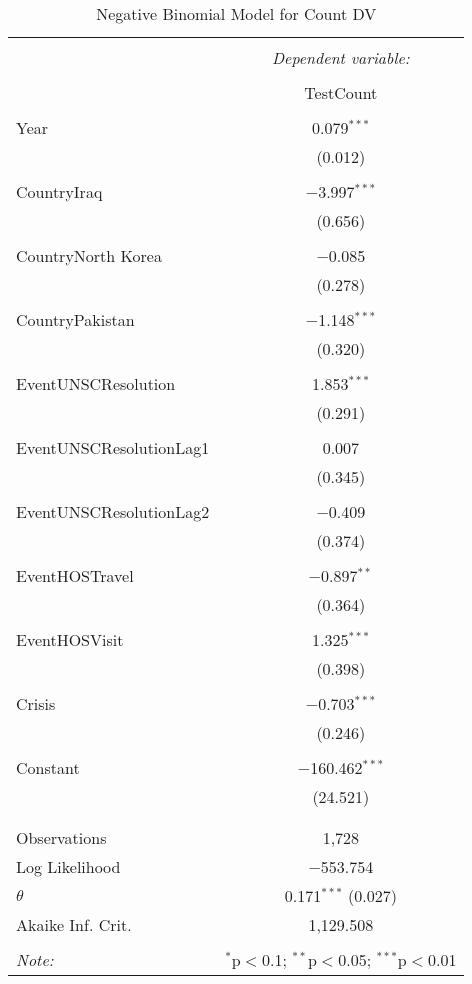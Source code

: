\documentclass{article}
\begin{document}
\begin{table}[!htbp] \centering 
  \caption{Negative Binomial Model for Count DV} 
  \label{} 
\begin{tabular}{@{\extracolsep{5pt}}lc} 
\\[-1.8ex]\hline 
\hline \\[-1.8ex] 
 & \multicolumn{1}{c}{\textit{Dependent variable:}} \\ 
\cline{2-2} 
\\[-1.8ex] & TestCount \\ 
\hline \\[-1.8ex] 
 Year & 0.079$^{***}$ \\ 
  & (0.012) \\ 
  & \\ 
 CountryIraq & $-$3.997$^{***}$ \\ 
  & (0.656) \\ 
  & \\ 
 CountryNorth Korea & $-$0.085 \\ 
  & (0.278) \\ 
  & \\ 
 CountryPakistan & $-$1.148$^{***}$ \\ 
  & (0.320) \\ 
  & \\ 
 EventUNSCResolution & 1.853$^{***}$ \\ 
  & (0.291) \\ 
  & \\ 
 EventUNSCResolutionLag1 & 0.007 \\ 
  & (0.345) \\ 
  & \\ 
 EventUNSCResolutionLag2 & $-$0.409 \\ 
  & (0.374) \\ 
  & \\ 
 EventHOSTravel & $-$0.897$^{**}$ \\ 
  & (0.364) \\ 
  & \\ 
 EventHOSVisit & 1.325$^{***}$ \\ 
  & (0.398) \\ 
  & \\ 
 Crisis & $-$0.703$^{***}$ \\ 
  & (0.246) \\ 
  & \\ 
 Constant & $-$160.462$^{***}$ \\ 
  & (24.521) \\ 
  & \\ 
\hline \\[-1.8ex] 
Observations & 1,728 \\ 
Log Likelihood & $-$553.754 \\ 
$\theta$ & 0.171$^{***}$  (0.027) \\ 
Akaike Inf. Crit. & 1,129.508 \\ 
\hline 
\hline \\[-1.8ex] 
\textit{Note:}  & \multicolumn{1}{r}{$^{*}$p$<$0.1; $^{**}$p$<$0.05; $^{***}$p$<$0.01} \\ 
\end{tabular} 
\end{table} 
\end{document}
